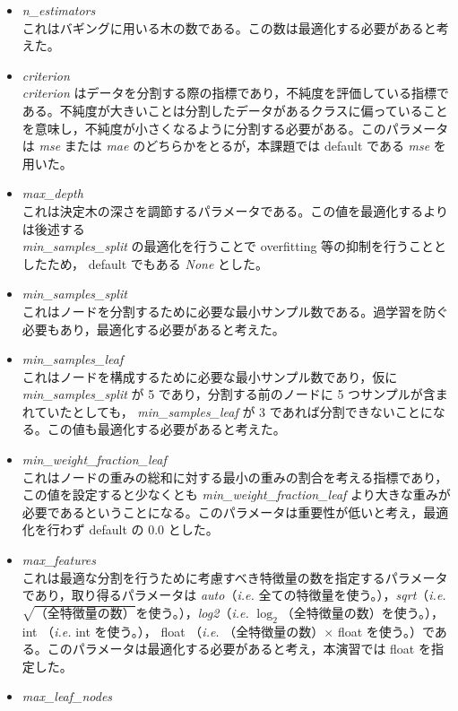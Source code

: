 \documentclass[a4j,11pt]{jarticle}
\begin{document}
\begin{itemize}
\item \textit{n\_estimators}\\
これはバギングに用いる木の数である。この数は最適化する必要があると考えた。
\item \textit{criterion}\\
 \textit{criterion} はデータを分割する際の指標であり，不純度を評価している指標である。不純度が大きいことは分割したデータがあるクラスに偏っていることを意味し，不純度が小さくなるように分割する必要がある。このパラメータは \textit{mse} または \textit{mae} のどちらかをとるが，本課題では default である \textit{mse} を用いた。
\item \textit{max\_depth}\\
これは決定木の深さを調節するパラメータである。この値を最適化するよりは後述する\\ \textit{min\_samples\_split} の最適化を行うことで overfitting 等の抑制を行うこととしたため， default でもある \textit{None} とした。
\item \textit{min\_samples\_split}\\
これはノードを分割するために必要な最小サンプル数である。過学習を防ぐ必要もあり，最適化する必要があると考えた。
\item \textit{min\_samples\_leaf}\\
これはノードを構成するために必要な最小サンプル数であり，仮に \textit{min\_samples\_split} が 5 であり，分割する前のノードに 5 つサンプルが含まれていたとしても， \textit{min\_samples\_leaf} が 3 であれば分割できないことになる。この値も最適化する必要があると考えた。
\item \textit{min\_weight\_fraction\_leaf}\\
これはノードの重みの総和に対する最小の重みの割合を考える指標であり，この値を設定すると少なくとも \textit{min\_weight\_fraction\_leaf} より大きな重みが必要であるということになる。このパラメータは重要性が低いと考え，最適化を行わず default の $0.0$ とした。
\item \textit{max\_features}\\
これは最適な分割を行うために考慮すべき特徴量の数を指定するパラメータであり，取り得るパラメータは \textit{auto}（\textit{i.e.} 全ての特徴量を使う。），\textit{sqrt}（\textit{i.e.} $\sqrt{（全特徴量の数）}$を使う。），\textit{log2}（\textit{i.e.} $\log_2{（全特徴量の数）}$を使う。），int （\textit{i.e.} int を使う。）， float （\textit{i.e.} （全特徴量の数）$\times$ float を使う。）である。このパラメータは最適化する必要があると考え，本演習では float を指定した。
\item \textit{max\_leaf\_nodes}\\

\end{itemize}
\end{document}
